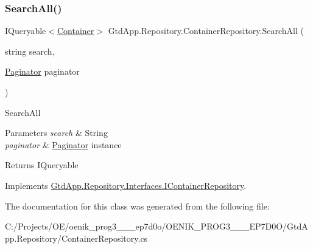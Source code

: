 \subsubsection{\texorpdfstring{Search\+All()}{SearchAll()}}
{\footnotesize\ttfamily I\+Queryable$<$\mbox{\hyperlink{class_gtd_app_1_1_data_1_1_container}{Container}}$>$ Gtd\+App.\+Repository.\+Container\+Repository.\+Search\+All (\begin{DoxyParamCaption}\item[{string}]{search,  }\item[{\mbox{\hyperlink{class_gtd_app_1_1_repository_1_1_paginator}{Paginator}}}]{paginator }\end{DoxyParamCaption})}



Search\+All 


\begin{DoxyParams}{Parameters}
{\em search} & String\\
\hline
{\em paginator} & \mbox{\hyperlink{class_gtd_app_1_1_repository_1_1_paginator}{Paginator}} instance\\
\hline
\end{DoxyParams}
\begin{DoxyReturn}{Returns}
I\+Queryable
\end{DoxyReturn}


Implements \mbox{\hyperlink{interface_gtd_app_1_1_repository_1_1_interfaces_1_1_i_container_repository_aa62fa4de64e7fa030d12aa6916d8231c}{Gtd\+App.\+Repository.\+Interfaces.\+I\+Container\+Repository}}.



The documentation for this class was generated from the following file\+:\begin{DoxyCompactItemize}
\item 
C\+:/\+Projects/\+O\+E/oenik\+\_\+prog3\+\_\+\_\+\_\+ep7d0o/\+O\+E\+N\+I\+K\+\_\+\+P\+R\+O\+G3\+\_\+\_\+\_\+\+E\+P7\+D0\+O/\+Gtd\+App.\+Repository/Container\+Repository.\+cs\end{DoxyCompactItemize}
